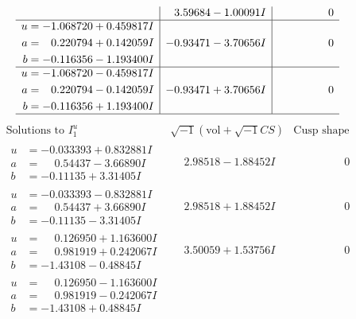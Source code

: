 \documentclass[1p]{elsarticle_modified}
\theoremstyle{definition}
\newcommand{\I}{\sqrt{-1}}
\begin{document}
$$\begin{array}{c|c|c}
 & \phantom{-}3.59684 - 1.00091 I & \phantom{-0.000000 } 0 \\ \hline\begin{aligned}
u &= -1.068720 + 0.459817 I \\
a &= \phantom{-}0.220794 + 0.142059 I \\
b &= -0.116356 - 1.193400 I\end{aligned}
 & -0.93471 - 3.70656 I & \phantom{-0.000000 } 0 \\ \hline\begin{aligned}
u &= -1.068720 - 0.459817 I \\
a &= \phantom{-}0.220794 - 0.142059 I \\
b &= -0.116356 + 1.193400 I\end{aligned}
 & -0.93471 + 3.70656 I & \phantom{-0.000000 } 0\\
 \hline 
 \end{array}$$\newpage$$\begin{array}{c|c|c}  
\text{Solutions to }I^u_{1}& \I (\text{vol} + \sqrt{-1}CS) & \text{Cusp shape}\\
 \hline 
\begin{aligned}
u &= -0.033393 + 0.832881 I \\
a &= \phantom{-}0.54437 - 3.66890 I \\
b &= -0.11135 + 3.31405 I\end{aligned}
 & \phantom{-}2.98518 - 1.88452 I & \phantom{-0.000000 } 0 \\ \hline\begin{aligned}
u &= -0.033393 - 0.832881 I \\
a &= \phantom{-}0.54437 + 3.66890 I \\
b &= -0.11135 - 3.31405 I\end{aligned}
 & \phantom{-}2.98518 + 1.88452 I & \phantom{-0.000000 } 0 \\ \hline\begin{aligned}
u &= \phantom{-}0.126950 + 1.163600 I \\
a &= \phantom{-}0.981919 + 0.242067 I \\
b &= -1.43108 - 0.48845 I\end{aligned}
 & \phantom{-}3.50059 + 1.53756 I & \phantom{-0.000000 } 0 \\ \hline\begin{aligned}
u &= \phantom{-}0.126950 - 1.163600 I \\
a &= \phantom{-}0.981919 - 0.242067 I \\
b &= -1.43108 + 0.48845 I\end{aligned}

\end{array}$$
\end{document}
